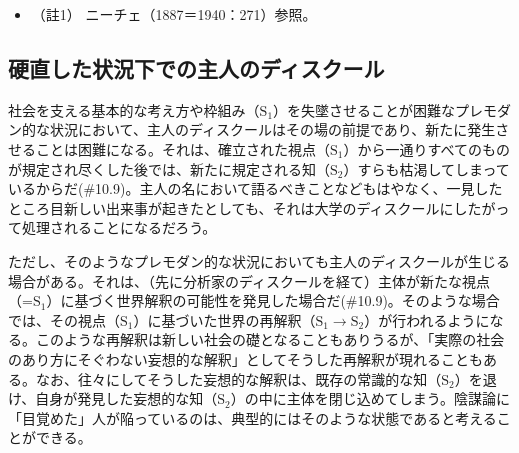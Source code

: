 \begin{itemize}
\tightlist
\item
  （註1） ニーチェ（1887＝1940：271）\cite{Nietzsche2}参照。
\end{itemize}

\subsection{硬直した状況下での主人のディスクール}\label{ux786cux76f4ux3057ux305fux72b6ux6cc1ux4e0bux3067ux306eux4e3bux4ebaux306eux30c7ux30a3ux30b9ux30afux30fcux30eb}

社会を支える基本的な考え方や枠組み（\(\textrm{S}_1\)）を失墜させることが困難な\mbox{プレモダン}的な状況において、\mbox{主人のディスクール}はその場の前提であり、新たに発生させることは困難になる。それは、確立された視点（\(\textrm{S}_1\)）から一通りすべてのものが規定され尽くした後では、新たに規定される知（\(\textrm{S}_2\)）すらも枯渇してしまっているからだ(\#10.9)。主人の名において語るべきことなどもはやなく、一見したところ目新しい出来事が起きたとしても、それは\mbox{大学のディスクール}にしたがって処理されることになるだろう。

ただし、そのような\mbox{プレモダン}的な状況においても\mbox{主人のディスクール}が生じる場合がある。それは、（先に\mbox{分析家のディスクール}を経て）主体が新たな視点（=\(\textrm{S}_1\)）に基づく世界解釈の可能性を発見した場合だ(\#10.9)。そのような場合では、その視点（\(\textrm{S}_1\)）に基づいた世界の再解釈（\(\textrm{S}_1\rightarrow\textrm{S}_2\)）が行われるようになる。このような再解釈は新しい社会の礎となることもありうるが、「実際の社会のあり方にそぐわない妄想的な解釈」としてそうした再解釈が現れることもある。なお、往々にしてそうした妄想的な解釈は、既存の常識的な知（\(\textrm{S}_2\)）を退け、自身が発見した妄想的な知（\(\textrm{S}_2\)）の中に主体を閉じ込めてしまう。陰謀論に「目覚めた」人が陥っているのは、典型的にはそのような状態であると考えることができる。

